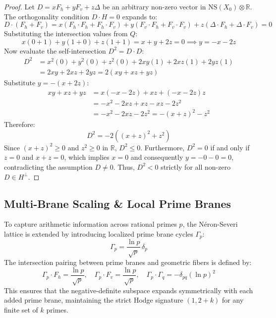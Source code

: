 \documentclass[11pt,a4paper]{article}
\theoremstyle{definition}
\theoremstyle{remark}
\begin{document}
\begin{proof}
Let $D = x F_h + y F_v + z \Delta$ be an arbitrary non-zero vector in $\mathrm{NS}(X_0) \otimes \mathbb{R}$. The orthogonality condition $D \cdot H = 0$ expands to:
\begin{equation}
D \cdot (F_h + F_v) = x(F_h \cdot F_h + F_h \cdot F_v) + y(F_v \cdot F_h + F_v \cdot F_v) + z(\Delta \cdot F_h + \Delta \cdot F_v) = 0
\end{equation}
Substituting the intersection values from $Q$:
\begin{equation}
x(0 + 1) + y(1 + 0) + z(1 + 1) = x + y + 2z = 0 \implies y = -x - 2z
\end{equation}
Now evaluate the self-intersection $D^2 = D \cdot D$:
\begin{align}
D^2 &= x^2(0) + y^2(0) + z^2(0) + 2xy(1) + 2xz(1) + 2yz(1) \nonumber \\
&= 2xy + 2xz + 2yz = 2(xy + xz + yz)
\end{align}
Substitute $y = -(x + 2z)$:
\begin{align}
xy + xz + yz &= x(-x - 2z) + xz + (-x - 2z)z \nonumber \\
&= -x^2 - 2xz + xz - xz - 2z^2 \nonumber \\
&= -x^2 - 2xz - 2z^2 = -(x + z)^2 - z^2
\end{align}
Therefore:
\begin{equation}
D^2 = -2\left((x + z)^2 + z^2\right)
\end{equation}
Since $(x + z)^2 \ge 0$ and $z^2 \ge 0$ in $\mathbb{R}$, $D^2 \le 0$. Furthermore, $D^2 = 0$ if and only if $z = 0$ and $x + z = 0$, which implies $x = 0$ and consequently $y = -0 - 0 = 0$, contradicting the assumption $D \ne 0$. Thus, $D^2 < 0$ strictly for all non-zero $D \in H^\perp$.
\end{proof}

\subsection{Multi-Brane Scaling \& Local Prime Branes}
To capture arithmetic information across rational primes $p$, the N\'eron-Severi lattice is extended by introducing localized prime brane cycles $\Gamma_p$:
\begin{equation}
\Gamma_p = \frac{\ln p}{\sqrt{p}} \, \delta_p
\end{equation}
The intersection pairing between prime branes and geometric fibers is defined by:
\begin{equation}
\Gamma_p \cdot F_h = \frac{\ln p}{\sqrt{p}}, \quad \Gamma_p \cdot F_v = \frac{\ln p}{\sqrt{p}}, \quad \Gamma_p \cdot \Gamma_q = -\delta_{pq} (\ln p)^2
\end{equation}
This ensures that the negative-definite subspace expands symmetrically with each added prime brane, maintaining the strict Hodge signature $(1, 2 + k)$ for any finite set of $k$ primes.
\end{document}
